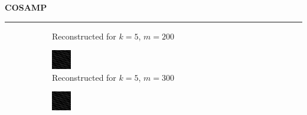 \documentclass[a4paper,12pt]{article}
\newenvironment{solution}[2][]{%
    \begin{mdframed}[linecolor=blue!70!black, linewidth=2pt, roundcorner=10pt, backgroundcolor=yellow!10!white, skipabove=12pt, skipbelow=12pt]%
        \textbf{\large #2}
        \par\noindent\rule{\textwidth}{0.4pt}
}{
    \end{mdframed}
}
\begin{document}
\begin{solution}{COSAMP}
\begin{figure}[H]
\begin{subfigure}[t]{0.23\textwidth}
            \caption{Reconstructed for $k = 5$, $m = 200$}
        \end{subfigure}
        \begin{subfigure}[t]{0.23\textwidth}
            \centering
            \includegraphics[width=\textwidth]{../images/cosamp/Reconstructed_k_5_m_300.png}
            \caption{Reconstructed for $k = 5$, $m = 300$}
        \end{subfigure}
        \begin{subfigure}[t]{0.23\textwidth}
            \centering
            \includegraphics[width=\textwidth]{../images/cosamp/Reconstructed_k_5_m_400.png}

\end{subfigure}
\end{figure}
\end{solution}
\end{document}

